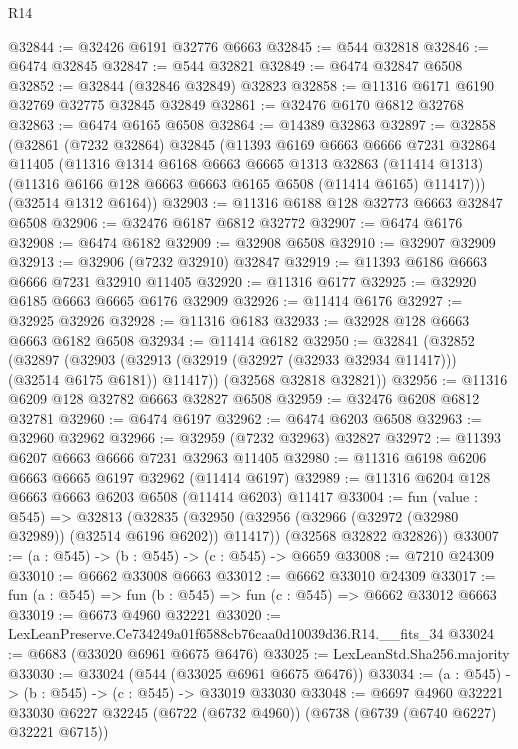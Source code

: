 \begin{lexlean}{R14}
\begin{coremodule}
@32844 := @32426 @6191 @32776 @6663
@32845 := @544 @32818
@32846 := @6474 @32845
@32847 := @544 @32821
@32849 := @6474 @32847 @6508
@32852 := @32844 (@32846 @32849) @32823
@32858 := @11316 @6171 @6190 @32769 @32775 @32845 @32849
@32861 := @32476 @6170 @6812 @32768
@32863 := @6474 @6165 @6508
@32864 := @14389 @32863
@32897 := @32858
    (@32861
      (@7232 @32864)
      @32845
      (@11393
        @6169
        @6663
        @6666
        @7231
        @32864
        @11405
        (@11316
          @1314
          @6168
          @6663
          @6665
          @1313
          @32863
          (@11414 @1313)
          (@11316 @6166 @128 @6663 @6663 @6165 @6508 (@11414 @6165) @11417)))
      (@32514 @1312 @6164))
@32903 := @11316 @6188 @128 @32773 @6663 @32847 @6508
@32906 := @32476 @6187 @6812 @32772
@32907 := @6474 @6176
@32908 := @6474 @6182
@32909 := @32908 @6508
@32910 := @32907 @32909
@32913 := @32906 (@7232 @32910) @32847
@32919 := @11393 @6186 @6663 @6666 @7231 @32910 @11405
@32920 := @11316 @6177
@32925 := @32920 @6185 @6663 @6665 @6176 @32909
@32926 := @11414 @6176
@32927 := @32925 @32926
@32928 := @11316 @6183
@32933 := @32928 @128 @6663 @6663 @6182 @6508
@32934 := @11414 @6182
@32950 := @32841
    (@32852
      (@32897
        (@32903 (@32913 (@32919 (@32927 (@32933 @32934 @11417))) (@32514 @6175 @6181)) @11417))
      (@32568 @32818 @32821))
@32956 := @11316 @6209 @128 @32782 @6663 @32827 @6508
@32959 := @32476 @6208 @6812 @32781
@32960 := @6474 @6197
@32962 := @6474 @6203 @6508
@32963 := @32960 @32962
@32966 := @32959 (@7232 @32963) @32827
@32972 := @11393 @6207 @6663 @6666 @7231 @32963 @11405
@32980 := @11316 @6198 @6206 @6663 @6665 @6197 @32962 (@11414 @6197)
@32989 := @11316 @6204 @128 @6663 @6663 @6203 @6508 (@11414 @6203) @11417
@33004 := fun (value : @545) =>
  @32813
    (@32835
      (@32950 (@32956 (@32966 (@32972 (@32980 @32989)) (@32514 @6196 @6202)) @11417))
      (@32568 @32822 @32826))
@33007 := (a : @545) -> (b : @545) -> (c : @545) -> @6659
@33008 := @7210 @24309
@33010 := @6662 @33008 @6663
@33012 := @6662 @33010 @24309
@33017 := fun (a : @545) => fun (b : @545) => fun (c : @545) => @6662 @33012 @6663
@33019 := @6673 @4960 @32221
@33020 := LexLeanPreserve.Ce734249a01f6588cb76caa0d10039d36.R14.__fits_34
@33024 := @6683 (@33020 @6961 @6675 @6476)
@33025 := LexLeanStd.Sha256.majority
@33030 := @33024 (@544 (@33025 @6961 @6675 @6476))
@33034 := (a : @545) -> (b : @545) -> (c : @545) -> @33019 @33030
@33048 := @6697
    @4960
    @32221
    @33030
    @6227
    @32245
    (@6722 (@6732 @4960))
    (@6738 (@6739 (@6740 @6227) @32221 @6715))

\end{coremodule}
\end{lexlean}
